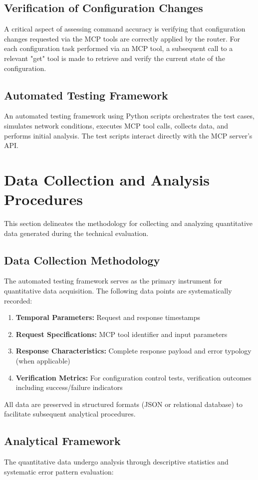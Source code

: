\subsection{Verification of Configuration Changes}
A critical aspect of assessing command accuracy is verifying that configuration changes requested via the MCP tools are correctly applied by the router. For each configuration task performed via an MCP tool, a subsequent call to a relevant "get" tool is made to retrieve and verify the current state of the configuration.
\subsection{Automated Testing Framework}
An automated testing framework using Python scripts orchestrates the test cases, simulates network conditions, executes MCP tool calls, collects data, and performs initial analysis. The test scripts interact directly with the MCP server's API.
\section{Data Collection and Analysis Procedures}
This section delineates the methodology for collecting and analyzing quantitative data generated during the technical evaluation.
\subsection{Data Collection Methodology}
The automated testing framework serves as the primary instrument for quantitative data acquisition. The following data points are systematically recorded:
\begin{enumerate}
\item \textbf{Temporal Parameters:} Request and response timestamps
\item \textbf{Request Specifications:} MCP tool identifier and input parameters
\item \textbf{Response Characteristics:} Complete response payload and error typology (when applicable)
\item \textbf{Verification Metrics:} For configuration control tests, verification outcomes including success/failure indicators
\end{enumerate}
All data are preserved in structured formats (JSON or relational database) to facilitate subsequent analytical procedures.
\subsection{Analytical Framework}
The quantitative data undergo analysis through descriptive statistics and systematic error pattern evaluation:
